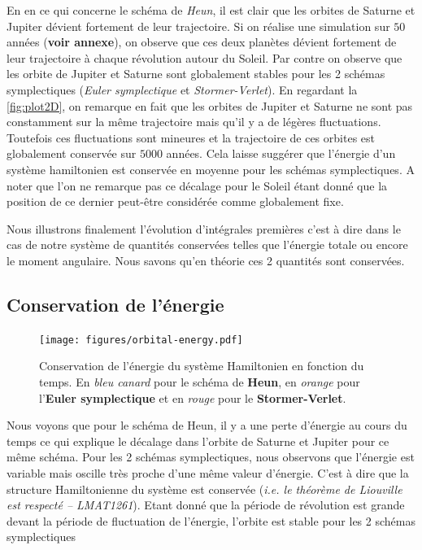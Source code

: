 \documentclass[11pt,twoside=semi,openright,numbers=noenddot]{article}
\begin{document}
En en ce qui concerne le schéma de \emph{Heun}, il est clair que les orbites de Saturne et Jupiter dévient fortement de leur trajectoire. Si on réalise une simulation sur $50$ années (\textbf{voir annexe}), on observe que ces deux planètes dévient fortement de leur trajectoire à chaque révolution autour du Soleil.
Par contre on observe que les orbite de Jupiter et Saturne sont globalement stables pour les 2 schémas symplectiques (\emph{Euler symplectique} et \emph{Stormer-Verlet}). En regardant la \autoref{fig:plot2D}, on remarque en fait que les orbites de Jupiter et Saturne ne sont pas constamment sur la même trajectoire mais qu'il y a de légères fluctuations. Toutefois ces fluctuations sont mineures et la trajectoire de ces orbites est globalement conservée sur $5000$ années. Cela laisse suggérer que l'énergie d'un système hamiltonien est conservée en moyenne pour les schémas symplectiques. A noter que l'on ne remarque pas ce décalage pour le Soleil étant donné que la position de ce dernier peut-être considérée comme globalement fixe.

Nous illustrons finalement l'évolution d'intégrales premières c'est à dire dans le cas de notre système de quantités conservées telles que l'énergie totale ou encore le moment angulaire. Nous savons qu'en théorie ces 2 quantités sont conservées.

\subsection{Conservation de l'énergie}


\begin{figure}[H]
    \centering
    \texttt{[image: figures/orbital-energy.pdf]}
    \caption{Conservation de l'énergie du système Hamiltonien en fonction du temps. En \emph{bleu canard} pour le schéma de \textbf{Heun}, en \emph{orange} pour l'\textbf{Euler symplectique} et en \emph{rouge} pour le \textbf{Stormer-Verlet}.}
    \label{fig:orbital-energy}
\end{figure}

Nous voyons que pour le schéma de Heun, il y a une perte d'énergie au cours du temps ce qui explique le décalage dans l'orbite de Saturne et Jupiter pour ce même schéma. Pour les 2 schémas symplectiques, nous observons que l'énergie est variable mais oscille très proche d'une même valeur d'énergie. C'est à dire que la structure Hamiltonienne du système est conservée (\emph{i.e. le théorème de Liouville est respecté -- LMAT1261}). Etant donné que la période de révolution est grande devant la période de fluctuation de l'énergie, l'orbite est stable pour les 2 schémas symplectiques
\end{document}

